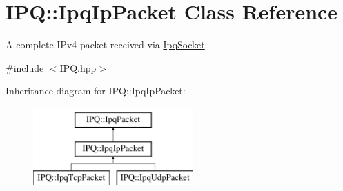 \hypertarget{classIPQ_1_1IpqIpPacket}{
\section{\-I\-P\-Q\-:\-:\-Ipq\-Ip\-Packet \-Class \-Reference}
\label{classIPQ_1_1IpqIpPacket}
}


\-A complete \-I\-Pv4 packet received via \hyperlink{classIPQ_1_1IpqSocket}{\-Ipq\-Socket}.  




{\ttfamily \#include $<$\-I\-P\-Q.\-hpp$>$}

\-Inheritance diagram for \-I\-P\-Q\-:\-:\-Ipq\-Ip\-Packet\-:\begin{figure}[H]
\begin{center}
\leavevmode
\includegraphics[height=3.000000cm]{classIPQ_1_1IpqIpPacket}
\end{center}
\end{figure}
